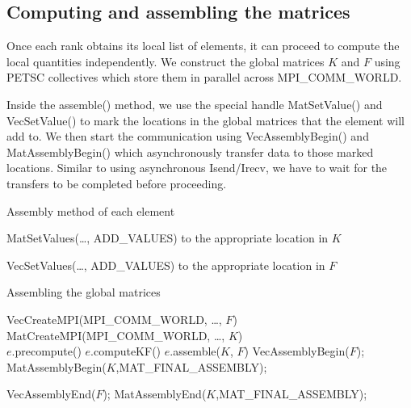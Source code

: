 \documentclass[12pt,notitlepage]{extreport}
\begin{document}
\subsection*{Computing and assembling the matrices}
Once each rank obtains its local list of elements, it can proceed to compute the local quantities independently. We construct the global matrices $K$ and $F$ using PETSC collectives which store them in parallel across MPI\_COMM\_WORLD.

Inside the assemble() method, we use the special handle MatSetValue() and VecSetValue() to mark the locations in the global matrices that the element will add to. We then start the communication using VecAssemblyBegin() and MatAssemblyBegin() which asynchronously transfer data to those marked locations. Similar to using asynchronous Isend/Irecv, we have to wait for the transfers to be completed before proceeding.

\begin{algorithm}[htp]
  \caption{Assembly method of each element}
  \begin{algorithmic}
    \State MatSetValues(\ldots, ADD\_VALUES) to the appropriate location in $K$
    \EndIf
    \EndFor

    \State VecSetValues(\ldots, ADD\_VALUES) to the appropriate location in $F$
    \EndIf
    \EndFor
    \EndProcedure
  \end{algorithmic}
\end{algorithm}

\begin{algorithm}[htp]
  \caption{Assembling the global matrices}
  \begin{algorithmic}
    \State VecCreateMPI(MPI\_COMM\_WORLD, \ldots, $F$)
    \State MatCreateMPI(MPI\_COMM\_WORLD, \ldots, $K$) \\
    \State $e$.precompute() 
    \State $e$.computeKF() 
    \State $e$.assemble($K$, $F$)
    \EndFor
    \State VecAssemblyBegin($F$);
    \State MatAssemblyBegin($K$,MAT\_FINAL\_ASSEMBLY);

    \State VecAssemblyEnd($F$);
    \State MatAssemblyEnd($K$,MAT\_FINAL\_ASSEMBLY);
  \end{algorithmic}
\end{algorithm}
\end{document}
